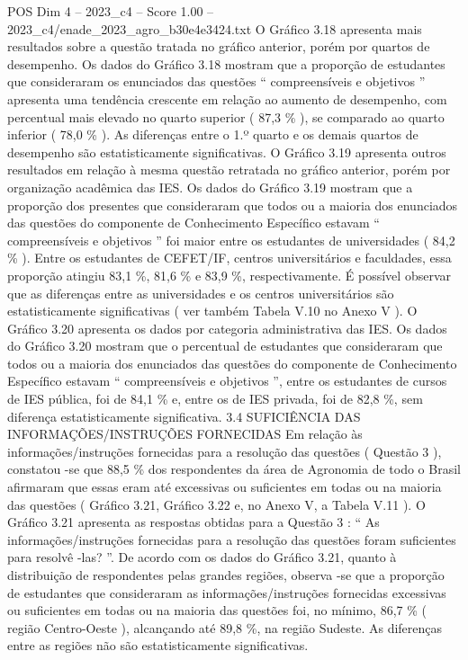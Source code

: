 \begin{textsample}{POS Dim 4 – 2023\_c4 – Score 1.00 – 2023\_c4/enade\_2023\_agro\_b30e4e3424.txt}
O Gráfico 3.18 apresenta mais resultados sobre a questão tratada no gráfico anterior, porém por quartos de desempenho.
Os dados do Gráfico 3.18 mostram que a proporção de estudantes que consideraram os enunciados das questões “ compreensíveis e objetivos ” apresenta uma tendência crescente em relação ao aumento de desempenho, com percentual mais elevado no quarto superior ( 87,3 \% ), se comparado ao quarto inferior ( 78,0 \% ).
As diferenças entre o 1.º quarto e os demais quartos de desempenho são estatisticamente significativas.
O Gráfico 3.19 apresenta outros resultados em relação à mesma questão retratada no gráfico anterior, porém por organização acadêmica das IES.
Os dados do Gráfico 3.19 mostram que a proporção dos presentes que consideraram que todos ou a maioria dos enunciados das questões do componente de Conhecimento Específico estavam “ compreensíveis e objetivos ” foi maior entre os estudantes de universidades ( 84,2 \% ).
Entre os estudantes de CEFET/IF, centros universitários e faculdades, essa proporção atingiu 83,1 \%, 81,6 \% e 83,9 \%, respectivamente.
É possível observar que as diferenças entre as universidades e os centros universitários são estatisticamente significativas ( ver também Tabela V.10 no Anexo V ).
O Gráfico 3.20 apresenta os dados por categoria administrativa das IES.
Os dados do Gráfico 3.20 mostram que o percentual de estudantes que consideraram que todos ou a maioria dos enunciados das questões do componente de Conhecimento Específico estavam “ compreensíveis e objetivos ”, entre os estudantes de cursos de IES pública, foi de 84,1 \% e, entre os de IES privada, foi de 82,8 \%, sem diferença estatisticamente significativa. 3.4 SUFICIÊNCIA DAS INFORMAÇÕES/INSTRUÇÕES FORNECIDAS Em relação às informações/instruções fornecidas para a resolução das questões ( Questão 3 ), constatou -se que 88,5 \% dos respondentes da área de Agronomia de todo o Brasil afirmaram que essas eram até excessivas ou suficientes em todas ou na maioria das questões ( Gráfico 3.21, Gráfico 3.22 e, no Anexo V, a Tabela V.11 ).
O Gráfico 3.21 apresenta as respostas obtidas para a Questão 3 : “ As informações/instruções fornecidas para a resolução das questões foram suficientes para resolvê -las? ”.
De acordo com os dados do Gráfico 3.21, quanto à distribuição de respondentes pelas grandes regiões, observa -se que a proporção de estudantes que consideraram as informações/instruções fornecidas excessivas ou suficientes em todas ou na maioria das questões foi, no mínimo, 86,7 \% ( região Centro-Oeste ), alcançando até 89,8 \%, na região Sudeste.
As diferenças entre as regiões não são estatisticamente significativas.

\end{textsample}
